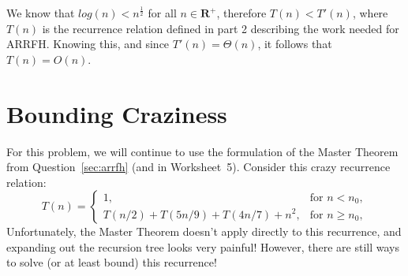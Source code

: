 \documentclass[11pt]{article}
\begin{document}
\begin{enumerate}
\begin{soln}
We know that $log(n) < n^\frac{1}{2}$ for all $n\in{\textbf{R}}^+$, therefore $T(n) < T'(n)$, where $T(n)$ is the recurrence relation defined in part 2 describing the work needed for ARRFH. Knowing this, and since $T'(n)=\Theta(n)$, it follows that $T(n)=O(n)$.
\end{soln}


\end{enumerate}

\newpage

\section{Bounding Craziness}

For this problem, we will continue to use the formulation of the
Master Theorem from Question~\ref{sec:arrfh} (and in Worksheet~5).
Consider this crazy recurrence relation:
  \[
  T(n) = \left\{
  \begin{array}{ll}
    1, & \mbox{for $n < n_0$}, \\
    T(n/2) + T(5n/9) + T(4n/7) + n^2, & \mbox{for $n \ge n_0$},
  \end{array} \right.
  \]
Unfortunately, the Master Theorem doesn't apply directly to this
recurrence, and expanding out the recursion tree looks very painful!
However, there are still ways to solve (or at least bound) this
recurrence!
\end{document}
